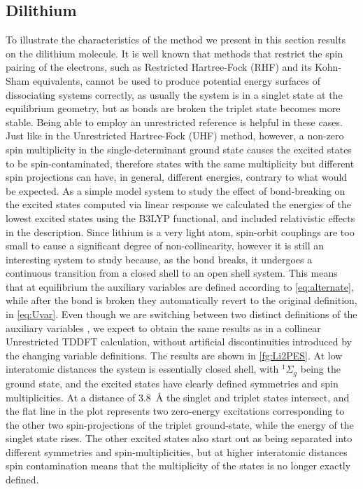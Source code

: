 \documentclass[12pt]{article}
\begin{document}
\subsection{Dilithium}
To illustrate the characteristics of the method we present in this section results on the dilithium molecule.
It is well known that methods that restrict the spin pairing of the electrons, such as Restricted Hartree-Fock (RHF) and its Kohn-Sham equivalents, cannot be used to produce potential energy surfaces of dissociating systems correctly, as usually the system is in a singlet state at the equilibrium geometry, but as bonds are broken the triplet state becomes more stable.
Being able to employ an unrestricted reference is helpful in these cases.
Just like in the Unrestricted Hartree-Fock (UHF) method, however, a non-zero spin multiplicity in the single-determinant ground state causes the excited states to be spin-contaminated,\cite{Casida09_60} therefore states with the same multiplicity but different spin projections can have, in general, different energies, contrary to what would be expected.
As a simple model system to study the effect of bond-breaking on the excited states computed via linear response we calculated the energies of the lowest excited states using the B3LYP functional, and included relativistic effects in the description.
Since lithium is a very light atom, spin-orbit couplings are too small to cause a significant degree of non-collinearity, however it is still an interesting system to study because, as the bond breaks, it undergoes a continuous transition from a closed shell to an open shell system.
This means that at equilibrium the auxiliary variables are defined according to \cref{eq:alternate}, while after the bond is broken they automatically revert to the original definition, in \cref{eq:Uvar}.
Even though we are switching between two distinct definitions of the auxiliary variables
, we expect to obtain the same results as in a collinear Unrestricted TDDFT calculation, without artificial discontinuities introduced by the changing variable definitions.
The results are shown in \cref{fg:Li2PES}.
At low interatomic distances the system is essentially closed shell, with $^1\Sigma_g$ being the ground state, and the excited states have clearly defined symmetries and spin multiplicities.
At a distance of 3.8~\r{A} the singlet and triplet states intersect, and the flat line in the plot represents two zero-energy excitations corresponding to the other two spin-projections of the triplet ground-state, while the energy of the singlet state rises.
The other excited states also start out as being separated into different symmetries and spin-multiplicities, but at higher interatomic distances spin contamination means that the multiplicity of the states is no longer exactly defined.
\end{document}
